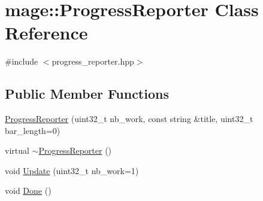\hypertarget{classmage_1_1_progress_reporter}{}\section{mage\+:\+:Progress\+Reporter Class Reference}
\label{classmage_1_1_progress_reporter}


{\ttfamily \#include $<$progress\+\_\+reporter.\+hpp$>$}

\subsection*{Public Member Functions}
\begin{DoxyCompactItemize}
\item 
\hyperlink{classmage_1_1_progress_reporter_a653b44699526baa17702cccd0fa58f78}{Progress\+Reporter} (uint32\+\_\+t nb\+\_\+work, const string \&title, uint32\+\_\+t bar\+\_\+length=0)
\item 
virtual \hyperlink{classmage_1_1_progress_reporter_aa543239c6dd4474a77cf4cf6904c1b26}{$\sim$\+Progress\+Reporter} ()
\item 
void \hyperlink{classmage_1_1_progress_reporter_a0a5f99f15e4152da9a3d6aadd888244a}{Update} (uint32\+\_\+t nb\+\_\+work=1)
\item 
void \hyperlink{classmage_1_1_progress_reporter_a11d758647ac2082bc296ab53a7454eaa}{Done} ()
\end{DoxyCompactItemize}
